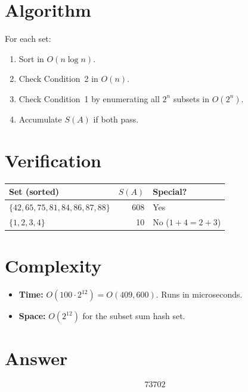 \documentclass[11pt]{article}
\begin{document}
\section{Algorithm}
For each set:
\begin{enumerate}
\item Sort in $O(n \log n)$.
\item Check Condition~2 in $O(n)$.
\item Check Condition~1 by enumerating all $2^n$ subsets in $O(2^n)$.
\item Accumulate $S(A)$ if both pass.
\end{enumerate}

\section{Verification}
\begin{center}
\begin{tabular}{lrl}
\toprule
Set (sorted) & $S(A)$ & Special? \\
\midrule
$\{42, 65, 75, 81, 84, 86, 87, 88\}$ & 608 & Yes \\
$\{1, 2, 3, 4\}$ & 10 & No ($1+4 = 2+3$) \\
\bottomrule
\end{tabular}
\end{center}

\section{Complexity}
\begin{itemize}
\item \textbf{Time:} $O(100 \cdot 2^{12}) = O(409{,}600)$. Runs in microseconds.
\item \textbf{Space:} $O(2^{12})$ for the subset sum hash set.
\end{itemize}

\section{Answer}

\[
\boxed{73702}
\]
\end{document}
